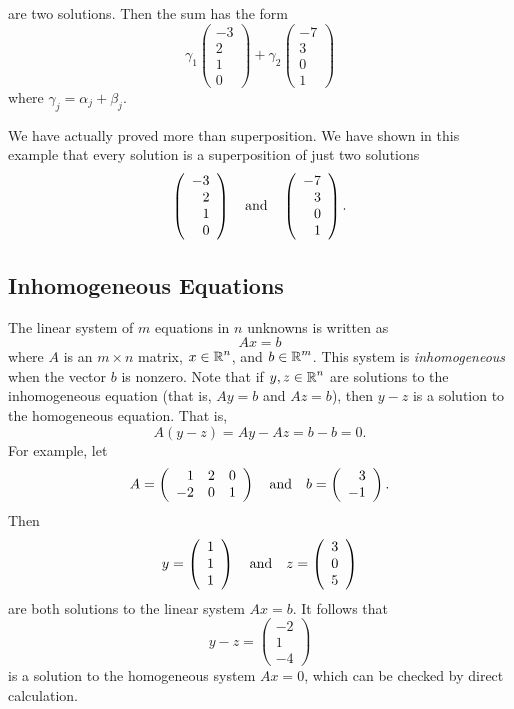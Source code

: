 \documentclass{ximera}
\begin{document}
are two solutions.  Then the sum has the form
\[
\gamma_1 \left(\begin{array}{r}-3\\2\\1\\0\end{array}\right) +
\gamma_2 \left(\begin{array}{r}-7\\3\\0\\1\end{array}\right)
\]
where $\gamma_j = \alpha_j + \beta_j$.


We have actually proved more than superposition.  We have shown
in this example that every solution is a superposition
of just two solutions
\[
\left(\begin{array}{r}-3\\2\\1\\0\end{array}\right) \quad\mbox{and}\quad
\left(\begin{array}{r}-7\\3\\0\\1\end{array}\right).
\]

\subsection*{Inhomogeneous Equations}

The linear system of $m$ equations in $n$ unknowns is written as
\[
Ax=b
\]
where $A$ is an $m\times n$ matrix, $x\in\mbox{$\Bbb{R}$}^n$, and $b\in\mbox{$\Bbb{R}$}^m$.
This system is {\em inhomogeneous\/} when the vector $b$ is nonzero.
Note that if $y,z\in\mbox{$\Bbb{R}$}^n$ are solutions to the inhomogeneous
equation (that is, $Ay=b$ and $Az=b$), then $y-z$ is a solution
to the homogeneous equation.  That is,
\[
A(y-z) = Ay - Az = b - b = 0.
\]
For example, let 
\[
A = \left(\begin{array}{rrr}  1 & 2 & 0 \\ -2 & 0 & 1 \end{array}\right)
\quad\mbox{and}\quad b = \left(\begin{array}{r} 3 \\ -1\end{array}\right).
\]
Then 
\[
y = \left(\begin{array}{c} 1\\1\\1\end{array}\right) \quad\mbox{and}\quad 
z =  \left(\begin{array}{c} 3\\0\\5\end{array}\right)
\]
are both solutions to the linear system $Ax=b$.  It follows that 
\[
y-z = \left(\begin{array}{r} -2\\1\\-4\end{array}\right)
\]
is a solution to the homogeneous system $Ax=0$, which can be checked by 
direct calculation.
\end{document}
